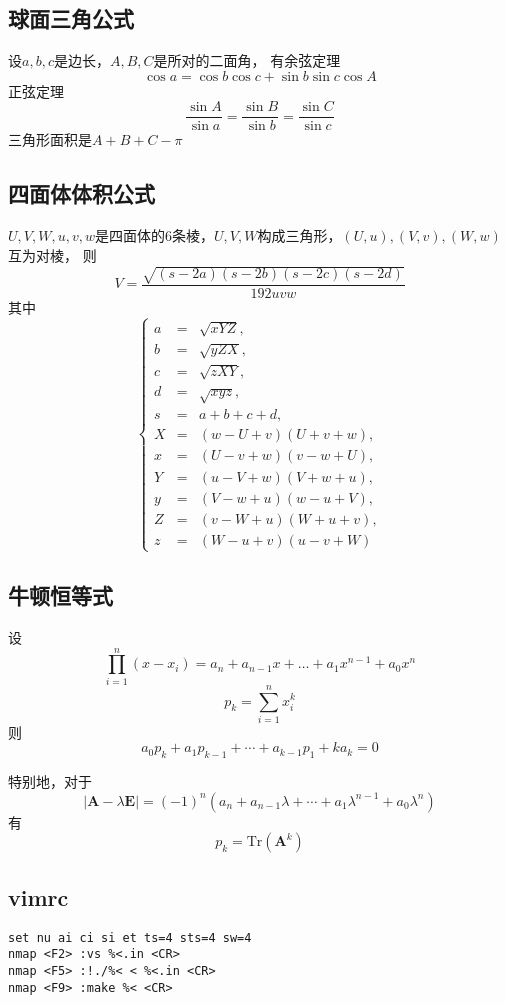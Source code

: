 \documentclass[a4paper]{article}
\begin{document}
\subsection{球面三角公式}

设$a, b, c$是边长，$A, B, C$是所对的二面角，
有余弦定理$$\cos a = \cos b \cos c + \sin b \sin c \cos A$$
正弦定理$$\frac{\sin A}{\sin a} = \frac{\sin B}{\sin b} = \frac{\sin C}{\sin c}$$
三角形面积是$A + B + C - \pi$

\subsection{四面体体积公式}

$U, V, W, u, v, w$是四面体的$6$条棱，$U, V, W$构成三角形，$(U, u), (V, v), (W, w)$互为对棱，
则$$V = \frac{\sqrt{(s - 2a)(s - 2b)(s - 2c)(s - 2d)}}{192 uvw}$$
其中$$\left\{\begin{array}{lll}
        a & = & \sqrt{xYZ}, \\
        b & = & \sqrt{yZX}, \\
        c & = & \sqrt{zXY}, \\
        d & = & \sqrt{xyz}, \\
        s & = & a + b + c + d, \\ 
        X & = & (w - U + v)(U + v + w), \\
        x & = & (U - v + w)(v - w + U), \\
        Y & = & (u - V + w)(V + w + u), \\
        y & = & (V - w + u)(w - u + V), \\
        Z & = & (v - W + u)(W + u + v), \\
        z & = & (W - u + v)(u - v + W)
    \end{array}\right.$$

\subsection{牛顿恒等式}

设$$\prod_{i = 1}^n{(x - x_i)} = a_n + a_{n - 1} x + \dots + a_1 x^{n - 1} + a_0 x^n$$
$$p_k = \sum_{i = 1}^n{x_i^k}$$
则$$a_0 p_k + a_1 p_{k - 1} + \cdots + a_{k - 1} p_1 + k a_k = 0$$

特别地，对于$$|\mathbf{A} - \lambda \mathbf{E}| = (-1)^n(a_n + a_{n - 1} \lambda + \cdots + a_1 \lambda^{n - 1} + a_0 \lambda^n)$$
有$$p_k = \mathrm{Tr}(\mathbf{A}^k)$$

\subsection{vimrc}

\begin{verbatim}
set nu ai ci si et ts=4 sts=4 sw=4
nmap <F2> :vs %<.in <CR>
nmap <F5> :!./%< < %<.in <CR>
nmap <F9> :make %< <CR>
\end{verbatim}
\end{document}
